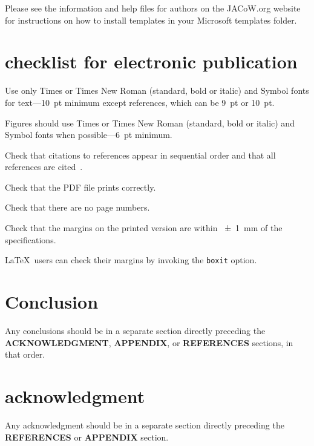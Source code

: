 \documentclass[acus,%
              ]{jacow}
\newcommand\SEC[1]{\textbf{\uppercase{#1}}}
\begin{document}
Please see the information and help files for authors on the JACoW.org website
for instructions  on  how to install templates in your Microsoft templates folder.

\section{checklist for electronic publication}

\begin{Itemize}
    \item  Use only Times or Times New Roman (standard, bold or italic) and Symbol
           fonts for text---\SI{10}{pt} minimum except references, which can be \SI{9}{pt} or \SI{10}{pt}.
    \item  Figures should use Times or Times New Roman (standard, bold or italic) and
           Symbol fonts when possible---\SI{6}{pt} minimum.
    \item  Check that citations to references appear in sequential order and
           that all references are cited~\cite{exampl-last}.
    \item  Check that the PDF file prints correctly.
    \item  Check that there are no page numbers.
    \item  Check that the margins on the printed version are within \SI{\pm1}{mm}
           of the specifications.
    \item  \LaTeX\ users can check their margins by invoking the
           \texttt{boxit} option.
\end{Itemize}

\section{Conclusion}

Any conclusions should be in a separate section directly preceding
the \SEC{Acknowledgment}, \SEC{Appendix}, or \SEC{References} sections, in that
order.

\section{acknowledgment}
Any acknowledgment should be in a separate section directly preceding
the \SEC{References} or \SEC{Appendix} section.

%
%
\iftrue   %
	\newpage
	\raggedend
\fi
\end{document}
